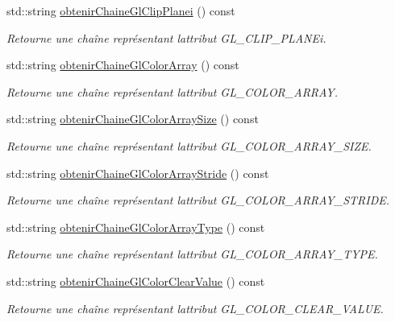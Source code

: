 \begin{DoxyCompactItemize}
std\+::string \hyperlink{group__utilitaire_ga7deb847efbc619585d5e8c9f6600204c}{obtenir\+Chaine\+Gl\+Clip\+Planei} () const 
\begin{DoxyCompactList}\small\item\em Retourne une chaîne représentant l\textquotesingle{}attribut G\+L\+\_\+\+C\+L\+I\+P\+\_\+\+P\+L\+A\+N\+Ei. \end{DoxyCompactList}\item 
std\+::string \hyperlink{group__utilitaire_ga8fae4f702f9be3574209f0721b6768ba}{obtenir\+Chaine\+Gl\+Color\+Array} () const 
\begin{DoxyCompactList}\small\item\em Retourne une chaîne représentant l\textquotesingle{}attribut G\+L\+\_\+\+C\+O\+L\+O\+R\+\_\+\+A\+R\+R\+A\+Y. \end{DoxyCompactList}\item 
std\+::string \hyperlink{group__utilitaire_gad1e82d8c71b8e2a76c806e1c92cbb669}{obtenir\+Chaine\+Gl\+Color\+Array\+Size} () const 
\begin{DoxyCompactList}\small\item\em Retourne une chaîne représentant l\textquotesingle{}attribut G\+L\+\_\+\+C\+O\+L\+O\+R\+\_\+\+A\+R\+R\+A\+Y\+\_\+\+S\+I\+Z\+E. \end{DoxyCompactList}\item 
std\+::string \hyperlink{group__utilitaire_gab499d52456b097364de8300cc6af6808}{obtenir\+Chaine\+Gl\+Color\+Array\+Stride} () const 
\begin{DoxyCompactList}\small\item\em Retourne une chaîne représentant l\textquotesingle{}attribut G\+L\+\_\+\+C\+O\+L\+O\+R\+\_\+\+A\+R\+R\+A\+Y\+\_\+\+S\+T\+R\+I\+D\+E. \end{DoxyCompactList}\item 
std\+::string \hyperlink{group__utilitaire_gae77f9acd8bdebe2e7bb39660e03b3e28}{obtenir\+Chaine\+Gl\+Color\+Array\+Type} () const 
\begin{DoxyCompactList}\small\item\em Retourne une chaîne représentant l\textquotesingle{}attribut G\+L\+\_\+\+C\+O\+L\+O\+R\+\_\+\+A\+R\+R\+A\+Y\+\_\+\+T\+Y\+P\+E. \end{DoxyCompactList}\item 
std\+::string \hyperlink{group__utilitaire_ga7de74c129bd5c5038e7f3d03a5508f72}{obtenir\+Chaine\+Gl\+Color\+Clear\+Value} () const 
\begin{DoxyCompactList}\small\item\em Retourne une chaîne représentant l\textquotesingle{}attribut G\+L\+\_\+\+C\+O\+L\+O\+R\+\_\+\+C\+L\+E\+A\+R\+\_\+\+V\+A\+L\+U\+E. \end{DoxyCompactList}\item 

\end{DoxyCompactItemize}
